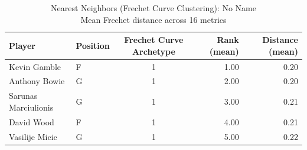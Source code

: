\begin{table}[t]
\caption*{
{\fontsize{20}{25} Nearest Neighbors (Frechet Curve Clustering): No Name\fontsize{12}{15}\selectfont } \\ 
{\fontsize{14}{17}\selectfont  Mean Frechet distance across 16 metrics\fontsize{12}{15}\selectfont }
} 
\fontsize{12.0pt}{14.0pt}\selectfont
\begin{tabular*}{\linewidth}{@{\extracolsep{\fill}}llcrr}
\toprule
Player & Position & Frechet Curve Archetype & Rank (mean) & Distance (mean) \\ 
\midrule\addlinespace[2.5pt]
Kevin Gamble & F & 1 & 1.00 & 0.20 \\ 
Anthony Bowie & G & 1 & 2.00 & 0.20 \\ 
Sarunas Marciulionis & G & 1 & 3.00 & 0.21 \\ 
David Wood & F & 1 & 4.00 & 0.21 \\ 
Vasilije Micic & G & 1 & 5.00 & 0.22 \\ 
\bottomrule
\end{tabular*}
\end{table}

